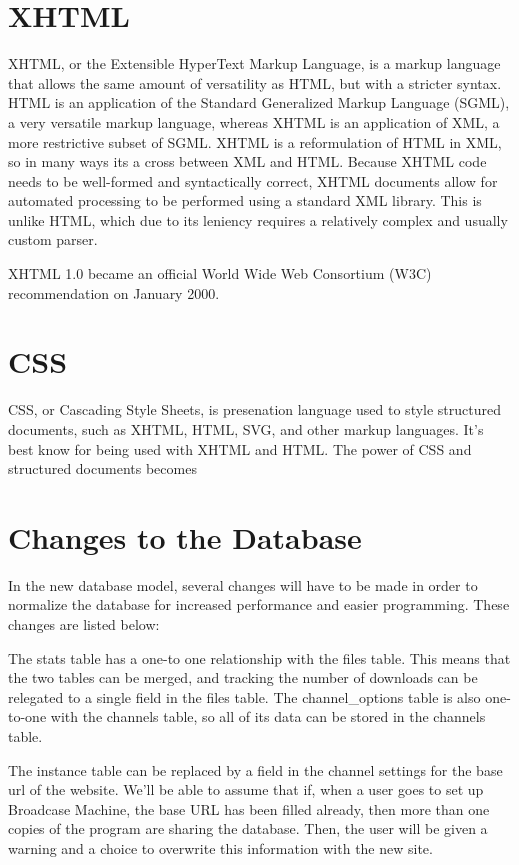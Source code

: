 \documentclass[a4paper,12pt]{report}
\begin{document}
\section{XHTML}
XHTML, or the Extensible HyperText Markup Language, is a markup language that allows the same amount of versatility as HTML, but with a stricter syntax. 
HTML is an application of the Standard Generalized Markup Language (SGML), a very versatile markup language, whereas XHTML is an application of XML, a more restrictive subset of SGML. 
XHTML is a reformulation of HTML in XML, so in many ways its a cross between XML and HTML. 
Because XHTML code needs to be well-formed and syntactically correct, XHTML documents allow for automated processing to be performed using a standard XML library. 
This is unlike HTML, which due to its leniency requires a relatively complex and usually custom parser. 


XHTML 1.0 became an official World Wide Web Consortium (W3C) recommendation on January 2000. 


\section {CSS}
CSS, or Cascading Style Sheets, is presenation language used to style structured documents, such as XHTML, HTML, SVG, and other markup languages. 
It's best know for being used with XHTML and HTML. 
The power of CSS and structured documents becomes 

\section{Changes to the Database}
In the new database model, several changes will have to be made in order to normalize the database for increased performance and easier programming. These changes are listed below:


The stats table has a one-to one relationship with the files table. This means that the two tables can be merged, and tracking the number of downloads can be relegated to a single field in the files table. The channel\_options table is also one-to-one with the channels table, so all of its data can be stored in the channels table.


The instance table can be replaced by a field in the channel settings for the base url of the website. We'll be able to assume that if, when a user goes to set up Broadcase Machine, the base URL has been filled already, then more than one copies of the program are sharing the database. Then, the user will be given a warning and a choice to overwrite this information with the new site.
\end{document}

